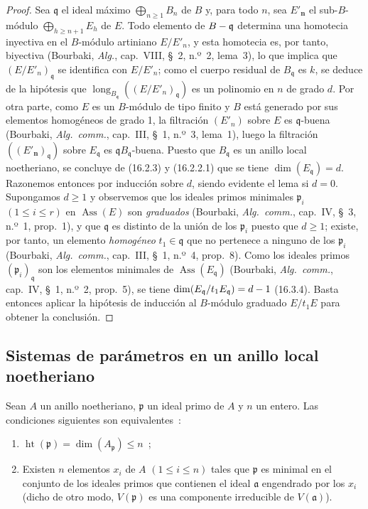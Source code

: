 \begin{proof}
Sea $\mathfrak{q}$ el ideal máximo $\bigoplus_{n\geq1}B_n$ de $B$ y, para todo
$n$, sea $E'_{\boldsymbol{n}}$ el sub-$B$-módulo $\bigoplus_{h\geq n+1}E_h$ de $E$. Todo
elemento de $B-\mathfrak{q}$ determina una homotecia inyectiva en el
$B$-módulo artiniano $E/E'_n$, y esta homotecia es, por tanto, biyectiva
(Bourbaki, \emph{Alg.}, cap.~VIII, \S~2, n.º~2, lema~3), lo que implica que
$(E/E'_n)_{\mathfrak{q}}$ se identifica con $E/E'_n$; como el cuerpo residual
de $B_{\mathfrak{q}}$ es $k$, se deduce de la hipótesis que
$\operatorname{long}_{B_{\mathfrak{q}}}((E/E'_n)_{\mathfrak{q}})$ es un
polinomio en $n$ de grado $d$. Por otra parte, como $E$ es un $B$-módulo de
tipo finito y $B$ está generado por sus elementos homogéneos de grado 1, la
filtración $(E'_n)$ sobre $E$ es $\mathfrak{q}$-buena (Bourbaki,
\emph{Alg.~comm.}, cap.~III, \S~1, n.º~3, lema~1), luego la filtración
$((E'_{\boldsymbol{n}})_{\mathfrak{q}})$ sobre $E_{\mathfrak{q}}$ es
$\mathfrak{q}B_{\mathfrak{q}}$-buena. Puesto que $B_{\mathfrak{q}}$ es un
anillo local noetheriano, se concluye de (16.2.3) y (16.2.2.1) que se tiene
$\dim(E_{\mathfrak{q}})=d$. Razonemos entonces por inducción sobre $d$, siendo
evidente el lema si $d=0$. Supongamos $d\geq1$ y observemos que los ideales
primos minimales $\mathfrak{p}_i$ $(1\leq i\leq r)$ en
$\operatorname{Ass}(E)$ son \emph{graduados} (Bourbaki, \emph{Alg.~comm.},
cap.~IV, \S~3, n.º~1, prop.~1), y que $\mathfrak{q}$ es distinto de la unión
de los $\mathfrak{p}_i$ puesto que $d\geq1$; existe, por tanto, un elemento
\emph{homogéneo} $t_1\in\mathfrak{q}$ que no pertenece a ninguno de los
$\mathfrak{p}_i$ (Bourbaki, \emph{Alg.~comm.}, cap.~III, \S~1, n.º~4,
prop.~8). Como los ideales primos $(\mathfrak{p}_i)_{\mathfrak{q}}$ son los
elementos minimales de $\operatorname{Ass}(E_{\mathfrak{q}})$ (Bourbaki,
\emph{Alg.~comm.}, cap.~IV, \S~1, n.º~2, prop.~5), se tiene
$\dim(E_{\mathfrak{q}}/t_1E_{\mathfrak{q}})=d- 1$ (16.3.4). Basta entonces
aplicar la hipótesis de inducción al $B$-módulo graduado $E/t_1E$ para obtener
la conclusión.
\end{proof}
\subsection{Sistemas de parámetros en un anillo local noetheriano}
\label{subsection:0.16.3-fr}

\begin{proposition}[16.3.1]
\label{0.16.3.1-fr}
Sean $A$ un anillo noetheriano, $\mathfrak{p}$ un ideal primo de $A$ y $n$ un
entero. Las condiciones siguientes son equivalentes~:
\begin{enumerate}
  \item[\textup{a)}] $\operatorname{ht}(\mathfrak{p})=
  \dim(A_{\mathfrak{p}})\leq n$~;
  \item[\textup{b)}] Existen $n$ elementos $x_i$ de $A$ $(1\leq i\leq n)$ tales que
  $\mathfrak{p}$ es minimal en el conjunto de los ideales primos que contienen
  el ideal $\mathfrak{a}$ engendrado por los $x_i$ \textup{(dicho de otro modo,}
  $V(\mathfrak{p})$ es una componente irreducible de $V(\mathfrak{a})$).
\end{enumerate}
\end{proposition}

